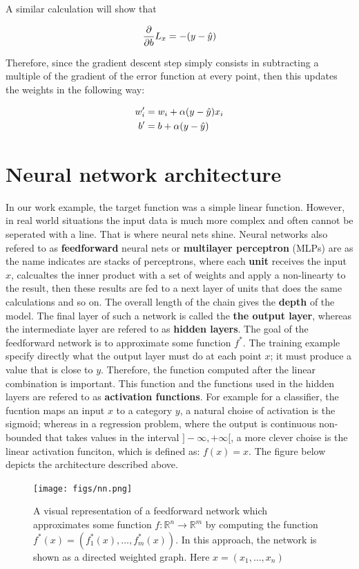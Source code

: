 A similar calculation will show that

$$
\frac{\partial}{\partial b} L_x = -(y - \hat{y})
$$

Therefore, since the gradient descent step simply consists in subtracting a multiple of the gradient of the error function at every point, then this updates the weights in the following way:

\begin{align}
  w^{\prime}_i &= w_i + \alpha (y - \hat{y})x_i \\
  b^{\prime} &= b + \alpha (y - \hat{y})
\end{align}

\section{Neural network architecture}
In our work example, the target function was a simple linear function. However, in real world situations the input data is much more complex and often cannot be seperated with a line. That is where neural nets shine. Neural networks also refered to as \textbf{feedforward} neural nets or \textbf{multilayer perceptron} (MLPs) are as the name indicates are stacks of perceptrons, where each \textbf{unit} receives the input $x$, calcualtes the inner product with a set of weights and apply a non-linearty to the result, then these results are fed to a next layer of units that does the same calculations and so on. The overall length of the chain gives the \textbf{depth} of the model. The final layer of such a network is called the \textbf{the output layer}, whereas the intermediate layer are refered to as \textbf{hidden layers}. The goal of the feedforward network is to approximate some function $f^*$. The training example specify directly what the output layer must do at each point $x$; it must produce a value that is close to $y$. Therefore, the function computed after the linear combination is important. This function and the functions used in the hidden layers are refered to as \textbf{activation functions}. For example for a classifier, the fucntion maps an input $x$ to a category $y$, a natural choise of activation is the sigmoid; whereas in a regression problem, where the output is continuous non-bounded that takes values in the interval $]-\infty, +\infty[$, a more clever choise is the linear activation funciton, which is defined as: $f(x) = x$.
The figure below depicts the architecture described above.

\begin{figure}[!htpb]
  \centering
  \texttt{[image: figs/nn.png]}
  \caption{A visual representation of a feedforward network which approximates some function $f : \mathbb{R}^n \longrightarrow \mathbb{R}^m$ by
    computing the function $f^*(x) = (f^*_1(x), \ldots, f^*_m(x))$. In this approach, the network is shown as a
    directed weighted graph. Here $x = (x_1, \ldots, x_n)$}\label{fig:ann}
\end{figure}

